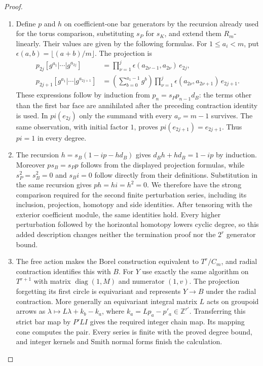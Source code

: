 \begin{proof}
\begin{enumerate}[label={$\langle1\rangle$\arabic*.}]
\item Define $p$ and $h$ on coefficient-one bar generators by the
recursion already used for the torus comparison, substituting
$s_P$ for $s_K$, and extend them $R_m$-linearly.  Their values
are given by the following formulas.
For $1\leq a_i<m$, put
$\epsilon(a,b)=\lfloor(a+b)/m\rfloor$.  The projection is
\[
\begin{split}
 p_{2j}[g^{a_1}|\cdots|g^{a_{2j}}]
   &=\prod_{\nu=1}^{j}\epsilon(a_{2\nu-1},a_{2\nu})\,e_{2j},\\
 p_{2j+1}[g^{a_1}|\cdots|g^{a_{2j+1}}]
   &=\left(\sum_{b=0}^{a_1-1}g^b\right)
       \prod_{\nu=1}^{j}\epsilon(a_{2\nu},a_{2\nu+1})\,e_{2j+1}.
\end{split}
\]
These expressions follow by induction from
$p_n=s_Pp_{n-1}d_B$: the terms other than the first bar face
are annihilated after the preceding contraction identity is
used.  In $pi(e_{2j})$ only the summand with every
$a_\nu=m-1$ survives.  The same observation, with initial
factor $1$, proves $pi(e_{2j+1})=e_{2j+1}$.
Thus $pi=1$ in every degree.

\item The recursion
$h=s_B(1-ip-hd_B)$ gives $d_Bh+hd_B=1-ip$ by induction.
Moreover $p s_B=s_Pp$ follows from the displayed projection
formulas, while $s_P^2=s_B^2=0$ and $s_Bi=0$ follow directly
from their definitions.  Substitution in the same recursion
gives $ph=hi=h^2=0$.  We therefore have the strong comparison
required for the second finite perturbation series, including
its inclusion, projection, homotopy and side identities.
After tensoring with the exterior coefficient module, the
same identities hold.  Every higher perturbation followed by
the horizontal homotopy lowers cyclic degree, so this added
description changes neither the termination proof nor the
$2^r$ generator bound.

\item The free action makes the Borel construction equivalent to
$T^r/C_m$, and radial contraction identifies this with $B$.
For $Y$ use exactly the same algorithm on $T^{r+1}$ with
matrix $\operatorname{diag}(1,M)$ and numerator $(1,v)$.
The projection forgetting its first circle is equivariant and
represents $Y\to B$ under the radial contraction.
More generally an equivariant integral matrix $L$ acts on
groupoid arrows as
$\lambda\mapsto L\lambda+k_b-k_a$, where
$k_a=Lp_a-p'_a\in\mathbb Z^{r'}$.
Transferring this strict bar map by $P'LI$ gives the required
integer chain map.  Its mapping cone computes the pair.
Every series is finite with the proved degree bound, and
integer kernels and Smith normal forms finish the calculation.
\end{enumerate}
\end{proof}











